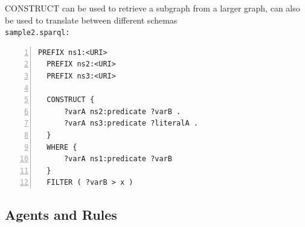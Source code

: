 CONSTRUCT can be used to retrieve a subgraph from a larger graph, can also be used to translate between different schemas \\
\texttt{sample2.sparql:}
\begin{lstlisting}[basicstyle=\ttfamily,numbers=left,numberstyle=\footnotesize\ttfamily,backgroundcolor=\color{sourcegray}]
  PREFIX ns1:<URI>
  PREFIX ns2:<URI>
  PREFIX ns3:<URI>

  CONSTRUCT {
      ?varA ns2:predicate ?varB .
      ?varA ns3:predicate ?literalA .
  }
  WHERE {
      ?varA ns1:predicate ?varB
  }
  FILTER ( ?varB > x )
\end{lstlisting}


\subsection{Agents and Rules}
\label{sec:semantic_logic_rules}



